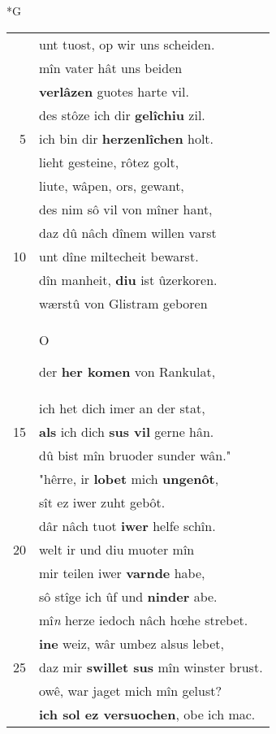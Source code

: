 \documentclass[8pt,a4paper,notitlepage]{article}
\begin{document}
\newpage
\begin{table}[ht]
\begin{minipage}[t]{0.5\linewidth}
\small
\begin{center}*G
\end{center}
\begin{tabular}{rl}
 & unt tuost, op wir uns scheiden.\\ 
 & mîn vater hât uns beiden\\ 
 & \textbf{verlâzen} guotes harte vil.\\ 
 & des stôze ich dir \textbf{gelîchiu} zil.\\ 
5 & ich bin dir \textbf{herzenlîchen} holt.\\ 
 & lieht gesteine, rôtez golt,\\ 
 & liute, wâpen, ors, gewant,\\ 
 & des nim sô vil von mîner hant,\\ 
 & daz dû nâch dînem willen varst\\ 
10 & unt dîne miltecheit bewarst.\\ 
 & dîn manheit, \textbf{diu} ist ûzerkoren.\\ 
 & wærstû von Glistram geboren\\ 
 & \begin{large}O\end{large}der \textbf{her komen} von Rankulat,\\ 
 & ich het dich imer an der stat,\\ 
15 & \textbf{als} ich dich \textbf{sus vil} gerne hân.\\ 
 & dû bist mîn bruoder sunder wân."\\ 
 & "hêrre, ir \textbf{lobet} mich \textbf{ungenôt},\\ 
 & sît ez iwer zuht gebôt.\\ 
 & dâr nâch tuot \textbf{iwer} helfe schîn.\\ 
20 & welt ir und diu muoter mîn\\ 
 & mir teilen iwer \textbf{varnde} habe,\\ 
 & sô stîge ich ûf und \textbf{ninder} abe.\\ 
 & mî\textit{n} herze iedoch nâch hœhe strebet.\\ 
 & \textbf{ine} weiz, wâr umbez alsus lebet,\\ 
25 & daz mir \textbf{swillet sus} mîn winster brust.\\ 
 & owê, war jaget mich mîn gelust?\\ 
 & \textbf{ich sol ez versuochen}, obe ich mac.\\ 

\end{tabular}
\end{minipage}
\end{table}
\end{document}
